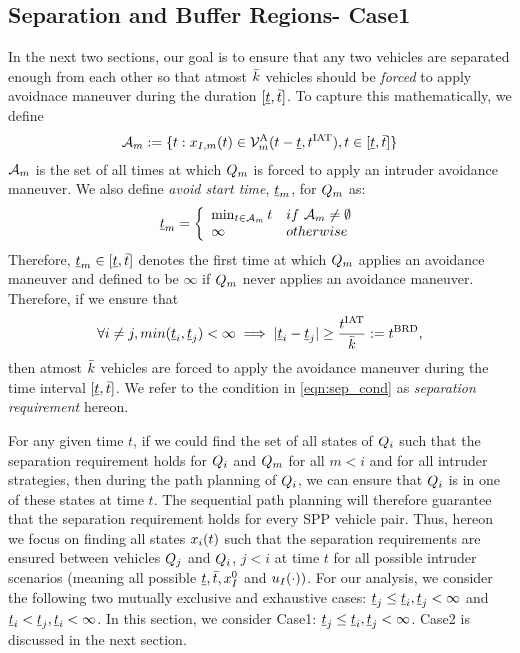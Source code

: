 \subsection{Separation and Buffer Regions- Case1} \label{sec:case1}
In the next two sections, our goal is to ensure that any two vehicles are separated enough from each other so that %
atmost $\bar{k}$ vehicles should be \textit{forced} to apply avoidnace maneuver during the duration $[\underline{t}, \bar{t}]$. To capture this mathematically, we define 
\begin{equation*}
\mathcal{A}_{m} := \{t: x_{I,m}(t) \in \mathcal{V}^{\text{A}}_{m}(t-\underline{t}, t^\text{IAT}), t \in [\underline{t}, \bar{t}]\}
\end{equation*} 
$\mathcal{A}_{m}$ is the set of all times at which $Q_m$ is forced to apply an intruder avoidance maneuver. We also define \textit{avoid start time}, $\underline{t}_m$, for $Q_m$ as:
\begin{equation}
\underline{t}_m  = 
\left \{ 
\begin{array}{ll}
\min_{t \in  \mathcal{A}_{m}} t & \relax{if~} \mathcal{A}_{m} \neq \emptyset\\
\infty & \relax{otherwise}
\end{array}
\right.
\end{equation}  
Therefore, $\underline{t}_m \in [\underline{t}, \bar{t}]$ denotes the first time at which $Q_m$ applies an avoidance maneuver and defined to be $\infty$ if $Q_m$ never applies an avoidance maneuver. %
Therefore, if we ensure that 
\begin{equation} \label{eqn:sep_cond}
\forall i \neq j, min(\tsa_i, \tsa_j)< \infty \implies |\tsa_i - \tsa_j| \geq \frac{\iat}{\nva} := \brd,
\end{equation}
then atmost $\bar{k}$ vehicles are forced to apply the avoidance maneuver during the time interval $[\underline{t}, \bar{t}]$. We refer to the condition in \eqref{eqn:sep_cond} as \textit{separation requirement} hereon. 

For any given time $t$, if we could find the set of all states of $Q_i$ such that the separation requirement holds for $Q_i$ and $Q_m$ for all $m<i$ and for all intruder strategies, then during the path planning of $Q_i$, we can ensure that $Q_i$ is in one of these states at time $t$. The sequential path planning will therefore guarantee that the separation requirement holds for every SPP vehicle pair. Thus, hereon we focus on finding all states $x_i(t)$ such that the separation requirements are ensured between vehicles $Q_j$ and $Q_i$, $j <i$ at time $t$ for all possible intruder scenarios (meaning all possible $\underline{t}, \bar{t}, x_{I}^0$ and $u_{I}(\cdot))$. For our analysis, we consider the following two mutually exclusive and exhaustive cases: $\underline{t}_j \leq \underline{t}_i, \underline{t}_j < \infty$ and $\underline{t}_i < \underline{t}_j, \underline{t}_i <\infty$. %
In this section, we consider Case1: $\underline{t}_j \leq \underline{t}_i, \underline{t}_j < \infty$. Case2 is discussed in the next section.  

